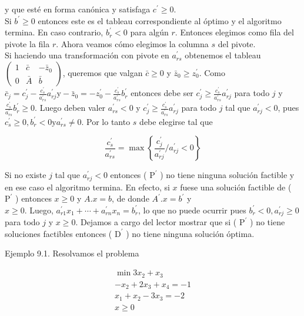 \documentclass[10pt]{article}
\begin{document}
y que esté en forma canónica y satisfaga $c^{\prime} \geq 0$.\\
Si $b^{\prime} \geq 0$ entonces este es el tableau correspondiente al óptimo y el algoritmo termina. En caso contrario, $b_{r}^{\prime}<0$ para algún $r$. Entonces elegimos como fila del pivote la fila $r$. Ahora veamos cómo elegimos la columna $s$ del pivote.\\
Si haciendo una transformación con pivote en $a_{r s}^{\prime}$ obtenemos el tableau $\left(\begin{array}{cc|c}1 & \bar{c} & -\bar{z}_{0} \\ 0 & \bar{A} & \bar{b}\end{array}\right)$, queremos que valgan $\bar{c} \geq 0$ y $\bar{z}_{0} \geq z_{0}^{\prime}$. Como $\bar{c}_{j}=c_{j}^{\prime}-\frac{c_{s}^{\prime}}{a_{r s}^{\prime}} a_{r j}^{\prime} \mathrm{y}-\bar{z}_{0}=-z_{0}^{\prime}-\frac{c_{s}^{\prime}}{a_{r s}^{\prime}} b_{r}^{\prime}$ entonces debe ser $c_{j}^{\prime} \geq \frac{c_{s}^{\prime}}{a_{r s}^{\prime}} a_{r j}^{\prime}$ para todo $j$ y $\frac{c_{s}^{\prime}}{a_{r s}^{\prime}} b_{r}^{\prime} \geq 0$. Luego deben valer $a_{r s}^{\prime}<0$ y $c_{j}^{\prime} \geq \frac{c_{s}^{\prime}}{a_{r s}^{\prime}} a_{r j}^{\prime}$ para todo $j$ tal que $a_{r j}^{\prime}<0$, pues $c_{s}^{\prime} \geq 0, b_{r}^{\prime}<0 \mathrm{y} a_{r s}^{\prime} \neq 0$. Por lo tanto $s$ debe elegirse tal que

$$
\frac{c_{s}^{\prime}}{a_{r s}^{\prime}}=\max \left\{\frac{c_{j}^{\prime}}{a_{r j}^{\prime}} / a_{r j}^{\prime}<0\right\}
$$

Si no existe $j$ tal que $a_{r j}^{\prime}<0$ entonces ( $\mathrm{P}^{\prime}$ ) no tiene ninguna solución factible y en ese caso el algoritmo termina. En efecto, si $x$ fuese una solución factible de ( $\mathrm{P}^{\prime}$ ) entonces $x \geq 0$ y $A . x=b$, de donde $A^{\prime} . x=b^{\prime}$ y\\
$x \geq 0$. Luego, $a_{r 1}^{\prime} x_{1}+\cdots+a_{r n}^{\prime} x_{n}=b_{r}^{\prime}$, lo que no puede ocurrir pues $b_{r}^{\prime}<0, a_{r j}^{\prime} \geq 0$ para todo $j$ y $x \geq 0$. Dejamos a cargo del lector mostrar que si ( $\mathrm{P}^{\prime}$ ) no tiene soluciones factibles entonces ( $\mathrm{D}^{\prime}$ ) no tiene ninguna solución óptima.

Ejemplo 9.1. Resolvamos el problema

$$
\begin{gathered}
\min 3 x_{2}+x_{3} \\
-x_{2}+2 x_{3}+x_{4}=-1 \\
x_{1}+x_{2}-3 x_{3}=-2 \\
x \geq 0
\end{gathered}
$$
\end{document}
